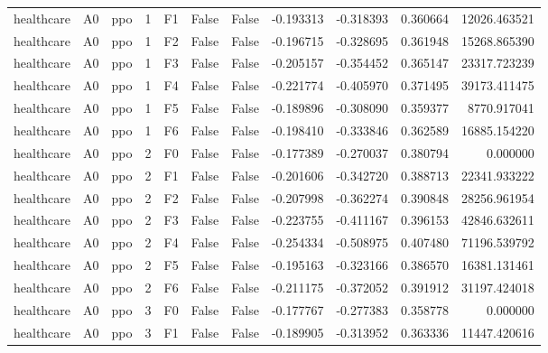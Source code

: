 \begin{tabular}{lllrlllrrrr}
healthcare &      A0 &       ppo &     1 &  F1 &           False &            False & -0.193313 & -0.318393 & 0.360664 &     12026.463521 \\
healthcare &      A0 &       ppo &     1 &  F2 &           False &            False & -0.196715 & -0.328695 & 0.361948 &     15268.865390 \\
healthcare &      A0 &       ppo &     1 &  F3 &           False &            False & -0.205157 & -0.354452 & 0.365147 &     23317.723239 \\
healthcare &      A0 &       ppo &     1 &  F4 &           False &            False & -0.221774 & -0.405970 & 0.371495 &     39173.411475 \\
healthcare &      A0 &       ppo &     1 &  F5 &           False &            False & -0.189896 & -0.308090 & 0.359377 &      8770.917041 \\
healthcare &      A0 &       ppo &     1 &  F6 &           False &            False & -0.198410 & -0.333846 & 0.362589 &     16885.154220 \\
healthcare &      A0 &       ppo &     2 &  F0 &           False &            False & -0.177389 & -0.270037 & 0.380794 &         0.000000 \\
healthcare &      A0 &       ppo &     2 &  F1 &           False &            False & -0.201606 & -0.342720 & 0.388713 &     22341.933222 \\
healthcare &      A0 &       ppo &     2 &  F2 &           False &            False & -0.207998 & -0.362274 & 0.390848 &     28256.961954 \\
healthcare &      A0 &       ppo &     2 &  F3 &           False &            False & -0.223755 & -0.411167 & 0.396153 &     42846.632611 \\
healthcare &      A0 &       ppo &     2 &  F4 &           False &            False & -0.254334 & -0.508975 & 0.407480 &     71196.539792 \\
healthcare &      A0 &       ppo &     2 &  F5 &           False &            False & -0.195163 & -0.323166 & 0.386570 &     16381.131461 \\
healthcare &      A0 &       ppo &     2 &  F6 &           False &            False & -0.211175 & -0.372052 & 0.391912 &     31197.424018 \\
healthcare &      A0 &       ppo &     3 &  F0 &           False &            False & -0.177767 & -0.277383 & 0.358778 &         0.000000 \\
healthcare &      A0 &       ppo &     3 &  F1 &           False &            False & -0.189905 & -0.313952 & 0.363336 &     11447.420616 \\

\end{tabular}
